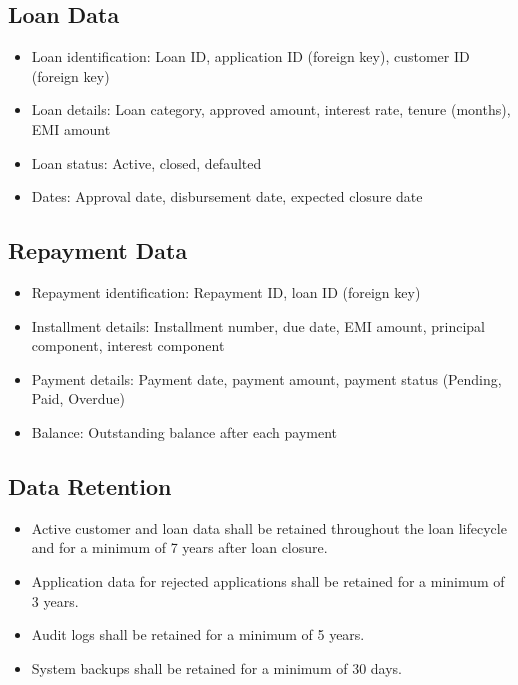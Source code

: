 \subsection{Loan Data}

\begin{itemize}
  \item Loan identification: Loan ID, application ID (foreign key), customer ID (foreign key)
  \item Loan details: Loan category, approved amount, interest rate, tenure (months), EMI amount
  \item Loan status: Active, closed, defaulted
  \item Dates: Approval date, disbursement date, expected closure date
\end{itemize}

\subsection{Repayment Data}

\begin{itemize}
  \item Repayment identification: Repayment ID, loan ID (foreign key)
  \item Installment details: Installment number, due date, EMI amount, principal component, interest component
  \item Payment details: Payment date, payment amount, payment status (Pending, Paid, Overdue)
  \item Balance: Outstanding balance after each payment
\end{itemize}

\subsection{Data Retention}

\begin{itemize}
  \item Active customer and loan data shall be retained throughout the loan lifecycle and for a minimum of 7 years after loan closure.
  \item Application data for rejected applications shall be retained for a minimum of 3 years.
  \item Audit logs shall be retained for a minimum of 5 years.
  \item System backups shall be retained for a minimum of 30 days.
\end{itemize}


